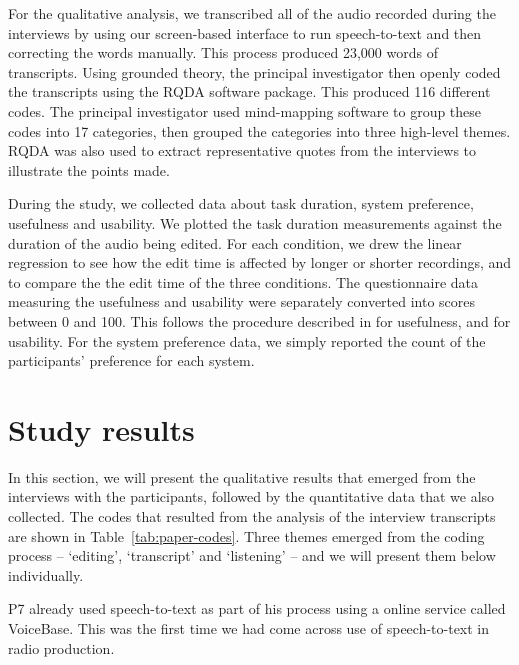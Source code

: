 For the qualitative analysis, we transcribed all of the audio recorded during the interviews by using our screen-based
interface to run speech-to-text and then correcting the words manually. This process produced 23,000 words of
transcripts. Using grounded theory, the principal investigator then openly coded the transcripts using the RQDA
software package. This produced 116 different codes. The principal investigator used mind-mapping software to group
these codes into 17 categories, then grouped the categories into three high-level themes. RQDA was also used to extract
representative quotes from the interviews to illustrate the points made.

During the study, we collected data about task duration, system preference, usefulness and usability.
We plotted the task duration measurements against the duration of the audio being edited. For each condition, we drew
the linear regression to see how the edit time is affected by longer or shorter recordings, and to compare the the edit
time of the three conditions.
The questionnaire data measuring the usefulness and usability were separately converted into scores between 0 and 100.
This follows the procedure described in \citet{Davis1989} for usefulness, and \citet{Brooke1996} for usability.
For the system preference data, we simply reported the count of the participants' preference for each system.

\section{Study results}\label{sec:paper-results}

In this section, we will present the qualitative results that emerged from the interviews with the participants,
followed by the quantitative data that we also collected.  The codes that resulted from the analysis of the interview
transcripts are shown in Table~\ref{tab:paper-codes}. Three themes emerged from the coding process -- `editing',
`transcript' and `listening' -- and we will present them below individually. 

P7 already used speech-to-text as part of his process using a online service called VoiceBase. This was the first time
we had come across use of speech-to-text in radio production.

